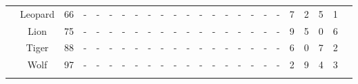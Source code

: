 \begin{table*}[t!]
{\begin{tabular}{c c c c cccccccccccccccccccc}
        & Leopard & 66 & - & - & - & - & - & - & - & - & - & - & - & - & - & - & - & - & 7 & 2 & 5 & 1 \\
        & Lion & 75 & - & - & - & - & - & - & - & - & - & - & - & - & - & - & - & - & 9 & 5 & 0 & 6 \\
        & Tiger & 88 & - & - & - & - & - & - & - & - & - & - & - & - & - & - & - & - & 6 & 0 & 7 & 2 \\
        & Wolf & 97 & - & - & - & - & - & - & - & - & - & - & - & - & - & - & - & - & 2 & 9 & 4 & 3 \\
        \midrule
        \bottomrule 
    \label{tbl:dataset_2}
    \end{tabular}}
\end{table*}
